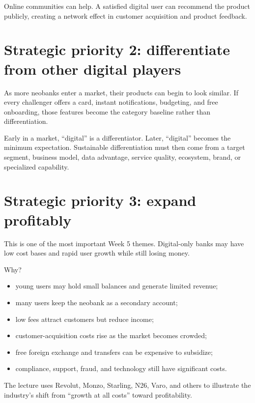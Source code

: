Online communities can help. A satisfied digital user can recommend the product publicly, creating a network effect in customer acquisition and product feedback.

\section{Strategic priority 2: differentiate from other digital players}

As more neobanks enter a market, their products can begin to look similar. If every challenger offers a card, instant notifications, budgeting, and free onboarding, those features become the category baseline rather than differentiation.

\begin{intuition}
Early in a market, ``digital'' is a differentiator. Later, ``digital'' becomes the minimum expectation. Sustainable differentiation must then come from a target segment, business model, data advantage, service quality, ecosystem, brand, or specialized capability.
\end{intuition}

\section{Strategic priority 3: expand profitably}

This is one of the most important Week 5 themes. Digital-only banks may have low cost bases and rapid user growth while still losing money.

Why?

\begin{itemize}
  \item young users may hold small balances and generate limited revenue;
  \item many users keep the neobank as a secondary account;
  \item low fees attract customers but reduce income;
  \item customer-acquisition costs rise as the market becomes crowded;
  \item free foreign exchange and transfers can be expensive to subsidize;
  \item compliance, support, fraud, and technology still have significant costs.
\end{itemize}

The lecture uses Revolut, Monzo, Starling, N26, Varo, and others to illustrate the industry's shift from ``growth at all costs'' toward profitability.

